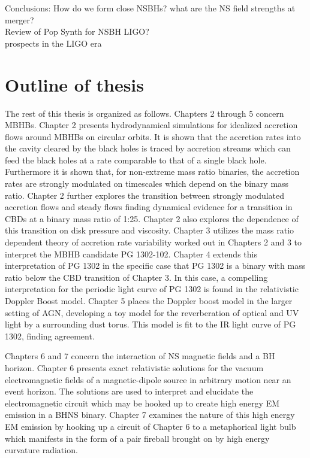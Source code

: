 Conclusions:
How do we form close NSBHs?
what are the NS field strengths at merger?\\

Review of Pop Synth for NSBH LIGO?\\
prospects in the LIGO era









\section{Outline of thesis}  
The rest of this thesis is organized as follows.
Chapters 2 through 5 concern MBHBs. Chapter 2 presents hydrodynamical
simulations for idealized accretion flows around MBHBs on circular orbits. It
is shown that the accretion rates into the cavity cleared by the black holes
is traced by accretion streams which can feed the black holes at a rate
comparable to that of a single black hole. Furthermore it is shown that, for
non-extreme mass ratio binaries, the accretion rates are strongly modulated on
timescales which depend on the binary mass ratio. Chapter 2 further explores
the transition between strongly modulated accretion flows and steady flows
finding dynamical evidence for a transition in CBDs at a binary mass ratio of
1:25. Chapter 2 also explores the dependence of this transition on disk
pressure and viscosity. Chapter 3 utilizes the mass ratio dependent theory of
accretion rate variability worked out in Chapters 2 and 3 to interpret the
MBHB candidate PG 1302-102. Chapter 4 extends this interpretation of PG 1302
in the specific case that PG 1302 is a binary with mass ratio below the CBD
transition of Chapter 3. In this case, a compelling interpretation for the
periodic light curve of PG 1302 is found in the relativistic Doppler Boost
model. Chapter 5 places the Doppler boost model in the larger setting of AGN,
developing a toy model for the reverberation of optical and UV light by a
surrounding dust torus. This model is fit to the IR light curve of PG 1302,
finding agreement.

Chapters 6 and 7 concern the interaction of NS magnetic fields and a BH
horizon. Chapter 6 presents exact relativistic solutions for the vacuum
electromagnetic fields of a magnetic-dipole source in arbitrary motion near an
event horizon. The solutions are used to interpret and elucidate the
electromagnetic circuit which may be hooked up to create high energy EM
emission in a BHNS binary. Chapter 7 examines the nature of this high energy EM emission by hooking up a circuit of Chapter 6 to a metaphorical light
bulb which manifests in the form of a pair fireball brought on by high energy
curvature radiation.



















